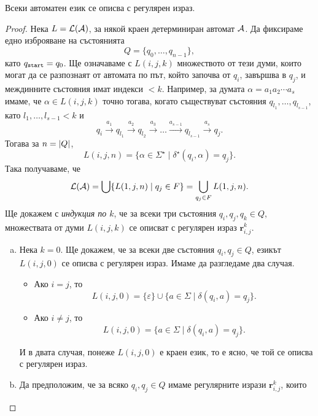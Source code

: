 \begin{framed}
\begin{thm}[Клини 1951]
  \label{th:regular-kleene}
  Всеки автоматен език се описва с регулярен израз.
\end{thm}
\end{framed}
\begin{proof}
  Нека  $L = \mathcal{L}(\mathcal{A})$, за някой краен детерминиран автомат $\mathcal{A}$.
  Да фиксираме едно изброяване на състоянията
  \[Q = \{q_0,\dots,q_{n-1}\},\]
  като $q_{\texttt{start}} = q_0$.
  Ще означаваме с $L(i,j,k)$ множеството от тези думи, които
  могат да се разпознаят от автомата по път, който започва от $q_i$,
  завършва в $q_j$, и междинните състояния имат индекси $< k$.
  Например, за думата $\alpha = a_1a_2\cdots a_s$ имаме, че $\alpha \in L(i,j,k)$
  точно тогава, когато съществуват състояния $q_{l_1},\dots,q_{l_{s-1}}$, като $l_1,\dots,l_{s-1} < k$ и
  \[q_i\stackrel{a_1}{\rightarrow} q_{l_1} \stackrel{a_2}{\rightarrow} q_{l_2} \stackrel{a_3}{\rightarrow} \dots \stackrel{a_{s-1}}{\rightarrow} q_{l_{s-1}}\stackrel{a_s}{\rightarrow} q_j.\]
  Тогава за $n = \vert{Q}\vert$, 
  \[L(i,j,n) = \{\alpha\in\Sigma^\star\mid \delta^\star(q_i,\alpha) = q_j\}.\]
  Така получаваме, че 
  \[\mathcal{L}(\mathcal{A}) = \bigcup\{L(1,j,n)\mid q_j \in F\} = \bigcup_{q_j\in F}L(1,j,n).\]
  Ще докажем с {\em индукция по $k$}, че за всеки три състояния $q_i,q_j,q_k \in Q$, множествата от думи $L(i,j,k)$
  се описват с регулярен израз $\mathbf{r}^k_{i,j}$.
  \begin{enumerate}[a)]
  \item
    Нека $k = 0$. Ще докажем, че за всеки две състояния $q_i,q_j \in Q$, езикът $L(i,j,0)$ се описва с регулярен израз.
    Имаме да разгледаме два случая.
    \begin{itemize}
    \item
      Ако $i = j$, то 
      \begin{equation}
        \label{eq:kleene-equal}
        L(i, j, 0) = \{\varepsilon\}\cup\{a\in\Sigma \mid \delta(q_i,a) = q_j\}.
      \end{equation}
    \item
      Ако $i \neq j$, то
      \[L(i, j, 0) = \{a\in\Sigma \mid \delta(q_i, a) = q_j\}.\]      
    \end{itemize}
    И в двата случая, понеже $L(i,j,0)$ е краен език, то е ясно, че той се описва с регулярен израз.
  \item
    Да предположим, че за всяко $q_i,q_j\in Q$ имаме регулярните изрази $\mathbf{r}^{k}_{i,j}$, които

\end{enumerate}
\end{proof}

